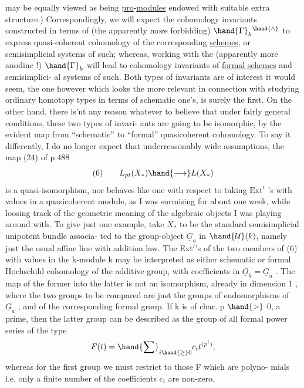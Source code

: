 
may be equally viewed as being \uline{pro}-\uline{modules} endowed with suitable extra
structure.) Cor\-res\-pond\-ing\-ly, we will expect the cohomology invariants
constructed in terms of (the apparently more forbidding) $\hand{\Gamma}_k{}^{\hand{\wedge}}$ to express
quasi-coherent cohomology of the corresponding \uline{schemes}, or semisimplicial
systems of such; whereas, working with the (apparently more anodine !)
$\hand{\Gamma}_k$ will lead to cohomology invariants of \uline{formal schemes} and semisimplici-%
al systems of such. Both types of invariants are of interest it would
seem, the one however which looks the more relevant in connection with
studying ordinary homotopy types in terms of schematic one's, is surely
the first. On the other hand, there is'nt any reason whatever to
believe that under fairly general conditions, these two types of invari-%
ants are going to be isomorphic, by the evident map from ``schematic'' to
``formal'' quasicoherent cohomology. To say it differently, I do no longer
expect that underreasonably wide assumptions, the map (24) of p.488
\[
(6)\qquad L_{pt}(X_{*})\hand{\longrightarrow} L(X_{*})
\]
is a quasi-isomorphism, nor behaves like one with respect to taking
$\mathrm{Ext}^{i}$ 's with values in a quasicoherent module, as I was  surmising for
about one week, while loosing track of the geometric meaning of the
algebraic objects I was playing around with. To give just one example,
take $X_{*}$ to be the standard semisimplicial  unipotent bundle associa-%
ted to the group-object $\underline{G}_a$ in $\hand{\mathcal{U}}(k)$, namely just the usual affine line
with addition law. The Ext$^{i}$'s of the two members of (6) with values in
the k-module k may be interpreted as either schematic or formal Hochschild
cohomology of the additive group, with coefficients in  $\underline{O}_k = \underline{G}_a$ .
The map of the former into the latter is not  an isomorphism, already
in dimension 1 , where the two groups to be compared are just the groups
of endomorphisms of $\underline{G}_a$ , and of the corresponding formal group. If k is
of char. p $\hand{>}$ 0, a prime, then the latter group can be described as the
group of all formal power series of the type
\[
F(t) = \hand{\sum}_{i\hand{\geq} 0} c_i t^{(p^{i})} ,
\]
whereas for the first group we must restrict to those F which are polyno-%
mials i.e.  only a finite number of the coefficients $c_i$ are non-zero.

